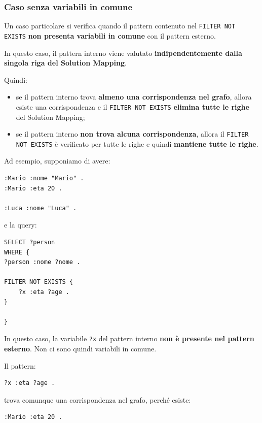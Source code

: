 \subsubsection{Caso senza variabili in comune}

Un caso particolare si verifica quando il pattern contenuto nel
\texttt{FILTER NOT EXISTS} \textbf{non presenta variabili in comune}
con il pattern esterno.

In questo caso, il pattern interno viene valutato \textbf{indipendentemente
dalla singola riga del Solution Mapping}.

Quindi:

\begin{itemize}
\item se il pattern interno trova \textbf{almeno una corrispondenza nel grafo},
allora esiste una corrispondenza e il \texttt{FILTER NOT EXISTS}
\textbf{elimina tutte le righe} del Solution Mapping;

\item se il pattern interno \textbf{non trova alcuna corrispondenza},
allora il \texttt{FILTER NOT EXISTS} è verificato per tutte le righe
e quindi \textbf{mantiene tutte le righe}.

\end{itemize}

Ad esempio, supponiamo di avere:

\begin{verbatim}
:Mario :nome "Mario" .
:Mario :eta 20 .

:Luca :nome "Luca" .
\end{verbatim}

e la query:

\begin{verbatim}
SELECT ?person
WHERE {
?person :nome ?nome .

FILTER NOT EXISTS {
    ?x :eta ?age .
}

}
\end{verbatim}

In questo caso, la variabile \texttt{?x} del pattern interno
\textbf{non è presente nel pattern esterno}. Non ci sono quindi
variabili in comune.

Il pattern:

\begin{verbatim}
?x :eta ?age .
\end{verbatim}

trova comunque una corrispondenza nel grafo, perché esiste:

\begin{verbatim}
:Mario :eta 20 .
\end{verbatim}

